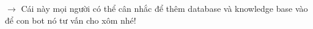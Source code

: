 $\rightarrow$ Cái này mọi người có thể cân nhắc để thêm database và knowledge base vào để con bot nó tư vấn cho xôm nhé!






    
